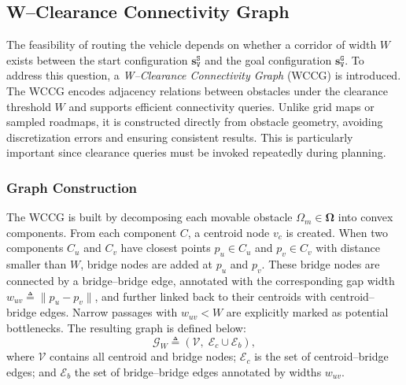\subsection{W--Clearance Connectivity Graph}\label{subsec:wccg}

The feasibility of routing the vehicle depends on whether a corridor of width
$W$ exists between the start configuration $\mathbf{s}_\texttt{V}^{\texttt{S}}$
and the goal configuration $\mathbf{s}_\texttt{V}^{\texttt{G}}$. To address
this question, a \emph{W--Clearance Connectivity Graph} (WCCG) is introduced.
The WCCG encodes adjacency relations between obstacles under the clearance
threshold $W$ and supports efficient connectivity queries. Unlike grid maps or
sampled roadmaps, it is constructed directly from obstacle geometry, avoiding
discretization errors and ensuring consistent results. This is particularly
important since clearance queries must be invoked repeatedly during planning.

\subsubsection{Graph Construction}
The WCCG is built by decomposing each movable obstacle
$\Omega_m\in\boldsymbol{\Omega}$ into convex components. From each component
$C$, a centroid node $v_c$ is created. When two components $C_u$ and $C_v$
have closest points $p_u\in C_u$ and $p_v\in C_v$ with distance smaller than
$W$, bridge nodes are added at $p_u$ and $p_v$. These bridge nodes are
connected by a bridge--bridge edge, annotated with the corresponding gap width
$w_{uv}\triangleq\|p_u-p_v\|$, and further linked back to their centroids with
centroid--bridge edges. Narrow passages with $w_{uv}<W$ are explicitly marked
as potential bottlenecks. The resulting graph is defined below:
\begin{equation}\label{eq:wccg}
\mathcal{G}_W\triangleq(\mathcal{V},\; \mathcal{E}_c\cup\mathcal{E}_b),
\end{equation}
where $\mathcal{V}$ contains all centroid and bridge nodes;
$\mathcal{E}_c$ is the set of centroid--bridge edges; and $\mathcal{E}_b$ the
set of bridge--bridge edges annotated by widths $w_{uv}$.

